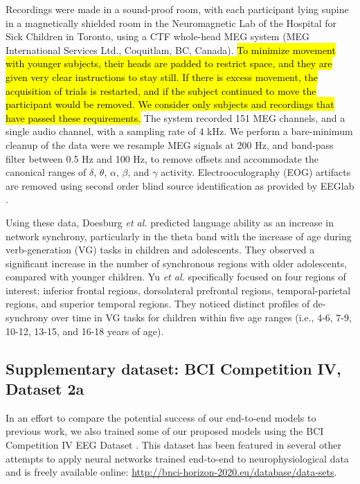 \documentclass[fleqn,10pt]{wlscirep}
\newcommand{\newadd}[1]{{\sethlcolor{cyan}\hl{#1}}}
\begin{document}
Recordings were made in a sound-proof room, with each participant lying supine in a magnetically shielded room in the Neuromagnetic Lab of the Hospital for Sick Children in Toronto, using a CTF whole-head MEG system (MEG International Services Ltd., Coquitlam, BC, Canada). \newadd{To minimize movement with younger subjects, their heads are padded to restrict space, and they are given very clear instructions to stay still. If there is excess movement, the acquisition of trials is restarted, and if the subject continued to move the participant would be removed. We consider only subjects and recordings that have passed these requirements.} The system recorded 151 MEG channels, and a single audio channel, with a sampling rate of 4 kHz. We perform a bare-minimum cleanup of the data were we resample MEG signals at 200 Hz, and band-pass filter between 0.5 Hz and 100 Hz, to remove offsets and accommodate the canonical ranges of $\delta$, $\theta$, $\alpha$, $\beta$, and $\gamma$ activity. Electrooculography (EOG) artifacts are removed using second order blind source identification as provided by EEGlab \cite{Delorme04eeglab}.

Using these data, Doesburg {\em et al.} \cite{Doesburg2016} predicted language ability as an increase in network synchrony, particularly in the theta band with the increase of age during verb-generation (VG) tasks in children and adolescents. They observed a significant increase in the number of synchronous regions with older adolescents, compared with younger children. Yu {\em et al.} \cite{Yu2014} specifically focused on four regions of interest: inferior frontal regions, dorsolateral prefrontal regions, temporal-parietal regions, and superior temporal regions. They noticed distinct profiles of de-synchrony over time in VG tasks for children within five age ranges (i.e., 4-6, 7-9, 10-12, 13-15, and 16-18 years of age).

\subsection*{Supplementary dataset: BCI Competition IV, Dataset 2a}

In an effort to compare the potential success of our end-to-end models to previous work, we also trained some of our proposed models using the BCI Competition IV EEG Dataset \cite{Tangermann2012}. This dataset has been featured in several other attempts to apply neural networks trained end-to-end to neurophysiological data \cite{Schirrmeister2017,Tabar2017,Lawhern2017,Sun} and is freely available online: \url{http://bnci-horizon-2020.eu/database/data-sets}.
\end{document}
